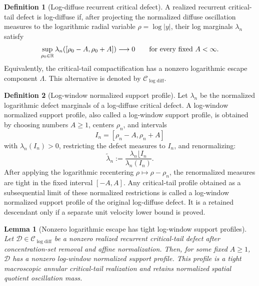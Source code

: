 \documentclass[11pt]{amsart}
\numberwithin{equation}{section}
\theoremstyle{plain}
\newtheorem{lemma}[lemma]{Lemma}
\theoremstyle{definition}
\newtheorem{definition}[definition]{Definition}
\theoremstyle{remark}
\newcommand{\Clogdiff}{\mathcal C_{\log\mathrm{diff}}}
\begin{document}
\begin{definition}[Log-diffuse recurrent critical defect]
\label{def:log-diffuse-recurrent-critical-defect}
A realized recurrent critical-tail defect is log-diffuse if, after projecting
the normalized diffuse oscillation measures to the logarithmic radial variable
\(\rho=\log |y|\), their log marginals \(\lambda_n\) satisfy
\[
   \sup_{\rho_0\in\mathbb R}
   \lambda_n([\rho_0-A,\rho_0+A])\longrightarrow0
   \qquad\hbox{for every fixed }A<\infty .
\]
Equivalently, the critical-tail compactification has a nonzero logarithmic
escape component \(\Lambda\).  This alternative is denoted by \(\Clogdiff\).
\end{definition}

\begin{definition}[Log-window normalized support profile]
\label{def:log-window-descendant}
Let \(\lambda_n\) be the normalized logarithmic defect marginals of a
log-diffuse critical defect.  A log-window normalized support profile, also
called a log-window support profile, is obtained by choosing
numbers \(A\ge1\), centers \(\rho_n\), and intervals
\[
   I_n=[\rho_n-A,\rho_n+A]
\]
with \(\lambda_n(I_n)>0\), restricting the defect measures to \(I_n\), and
renormalizing:
\[
   \widetilde\lambda_n
   :=
   \frac{\lambda_n\lfloor I_n}{\lambda_n(I_n)} .
\]
After applying the logarithmic recentering \(\rho\mapsto\rho-\rho_n\), the
renormalized measures are tight in the fixed interval \([-A,A]\).  Any
critical-tail profile obtained as a subsequential limit of these normalized
restrictions is called a log-window normalized support profile of the original
log-diffuse defect.  It is a retained descendant only if a separate unit
velocity lower bound is proved.
\end{definition}

\begin{lemma}[Nonzero logarithmic escape has tight log-window support profiles]
\label{lem:log-window-descendant-selection}
Let \(\mathcal D\in\Clogdiff\) be a nonzero realized recurrent critical-tail
defect after concentration-set removal and affine normalization.  Then, for some
fixed \(A\ge1\), \(\mathcal D\) has a nonzero log-window normalized support
profile.  This profile is a tight macroscopic annular critical-tail realization and
retains normalized spatial quotient oscillation mass.
\end{lemma}
\end{document}
